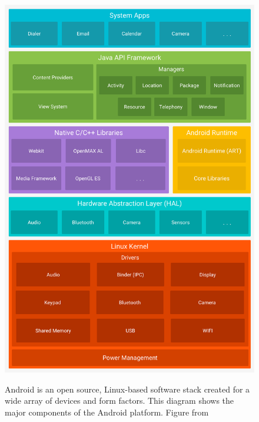 \begin{figure}[ht]
	\centering
	\includegraphics[width=\textwidth]{images/hello/android-stack.png}
	\label{fig:stack}
	\caption{Android is an open source, Linux-based software stack created for a wide array of devices and form factors.
			This diagram shows the major components of the Android platform. Figure from \cite{Google2017}}
\end{figure}

